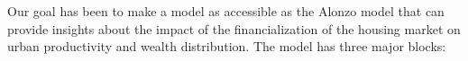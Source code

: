 












Our goal has been to make a model as accessible as the \Gls{Alonzo model} that can provide insights about the impact of the financialization of the housing market on urban productivity and wealth distribution.  The  model has three major blocks:

